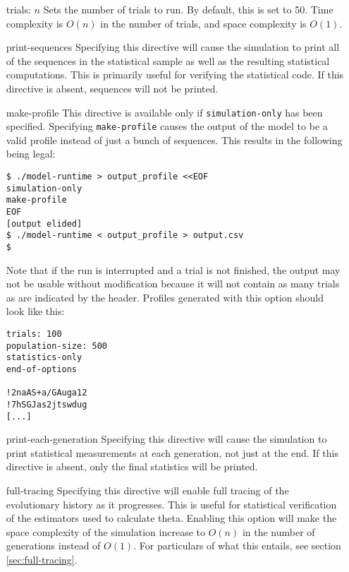 \documentclass{article}
\begin{document}
        \begin{enumerate}
          \item[trials: $n$]
          Sets the number of trials to run. By default, this is set to 50. Time
          complexity is $O(n)$ in the number of trials, and space complexity is
          $O(1)$.

          \item[print-sequences]
          Specifying this directive will cause the simulation to print all of
          the sequences in the statistical sample as well as the resulting
          statistical computations. This is primarily useful for verifying the
          statistical code. If this directive is absent, sequences will not be
          printed.

	  \item[make-profile]
	  This directive is available only if \verb|simulation-only| has been
	  specified. Specifying \verb|make-profile| causes the output of the
	  model to be a valid profile instead of just a bunch of sequences. This
	  results in the following being legal:

	  \begin{verbatim}
$ ./model-runtime > output_profile <<EOF
simulation-only
make-profile
EOF
[output elided]
$ ./model-runtime < output_profile > output.csv
$
	  \end{verbatim}

	  Note that if the run is interrupted and a trial is not finished, the
	  output may not be usable without modification because it will not
	  contain as many trials as are indicated by the header. Profiles
	  generated with this option should look like this:

	  \begin{verbatim}
trials: 100
population-size: 500
statistics-only
end-of-options

!2naAS+a/GAuga12
!7hSGJas2jtswdug
[...]
	  \end{verbatim}

          \item[print-each-generation]
          Specifying this directive will cause the simulation to print
          statistical measurements at each generation, not just at the end. If
          this directive is absent, only the final statistics will be printed.

          \item[full-tracing]
          Specifying this directive will enable full tracing of the evolutionary
          history as it progresses. This is useful for statistical verification
          of the estimators used to calculate theta. Enabling this option will
          make the space complexity of the simulation increase to $O(n)$ in the
          number of generations instead of $O(1)$. For particulars of what this
          entails, see section \ref{sec:full-tracing}.
        \end{enumerate}
\end{document}

